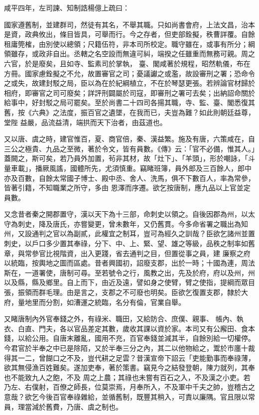\begin{pinyinscope}
 咸平四年，左司諫、知制誥楊億上疏曰：



 國家遵舊制，並建群司，然徒有其名，不舉其職。只如尚書會府，上法文昌，治本是資，政典攸出，條目皆具，可舉而行。今之存者，但吏部銓擬，秩曹詳覆。自餘租庸筦榷，由別使以總領；尺籍伍符，非本司所校定。職守雖在，或事有所分；綱領雖存，或政非自出。丞轄之名空設而無違可糾，端揆之任雖重而無務可親。周之六官，於是廢矣，且如寺、監素司於掌執，
 臺、閣咸著於規程，昭然軌儀，布在方冊。國家慮銓擬之不允，故置審官之司；憂議讞之或濫，故設審刑之署；恐命令之或失，故建封駁之局，臣以為在於紀綱植立，不在於琴瑟更張。若辨論官材歸於相府，即審官之司可廢矣；詳評刑闢屬於司寇，即審刑之署可去矣；出納詔命關於給事中，好封駁之局可罷矣。至於尚書二十四司各揚其職，寺、監、臺、閣悉復其舊，按《六典》之法度，振百官之遺墜，在我而已，夫豈為難？如此則朝廷益尊，堂陛
 益嚴，品流益清，端拱而天下治者，由茲道也。



 又以唐、虞之時，建官惟百，夏、商官倍，秦、漢益繁。施及有唐，六策咸在，自三公之極貴、九品之至微，著於令文，皆有員數。《傳》云：「官不必備，惟其人。」蓋闕之，斯可矣，若乃員外加置，茍非其材，故「灶下」、「羊頭」，形於嘲詠，「斗量車載」，播厥風謠，國體所先，尤須慎重。竊睹班簿，員外郎及三百餘人，郎中亦及百數，自餘太常國子博士、殿中丞、舍人、洗馬，俱不下數百人，率為常參，皆著引籍，不知職業之所守，多由
 恩澤而序遷。欲乞按唐制，應九品以上官並定員數。



 又念昔者秦之開郡置守，漢以天下為十三部，命刺史以領之。自後因郡為州，以太守為刺史，降及唐氏，亦嘗變更，曾未數年，又仍舊貫。今多命省署之職出為知州，又設通判之官以為副貳，此權宜之制耳，豈可為經久之訓哉？臣欲乞諸州並置刺史，以戶口多少置其奉祿，分下、中、上、緊、望、雄之等級，品秩之制率如舊章，與常參官比視階資，出入更踐，省去通判之目，但置從事之員，建
 廉察之府以統臨，按輿地之圖而區處。昔者興國初，詔廢支郡，出於一時；十國為連，周法斯在，一道署使，唐制可尋。至若號令之行，風教之出，先及於府，府以及州，州以及縣，縣及鄉里。自上而下，由近及遠，譬如身之使臂，臂之使指，提綱而眾目張，振領而群毛理。由是言之，支郡之不可廢也明矣。臣欲乞復置支郡，隸於大府，量地里而分割，如漕運之統臨，名分有倫，官業自舉。



 又睹唐制內外官奉錢之外，有祿米、職田，又給防合、庶僕、親事、
 帳內、執衣、白直、門夫，各以官品差定其數，歲收其課以資於家。本司又有公廨田、食本錢，以給公用。自唐末離亂，國用不充，百官奉錢並減其半，自餘別給一切權停。今君官於半奉之中已是除陌，又於半奉三分之內，其二以他物給之，鬻於市廛十裁得其一二，曾餬口之不及，豈代耕之足雲？昔漢宣帝下詔云「吏能勤事而奉祿薄，欲其無侵漁百姓難矣。遂加吏奉，著於策書。竊見今之結發登朝，陳力就列，其奉也不能致九人之飽，不及
 周之上農；其祿也未嘗有百石之入，不及漢之小吏。若乃左、右僕射，百僚之師長，位莫崇焉，月奉所入，不及軍中千夫之帥，豈稽古之意哉？欲乞今後百官奉祿雜給，並循舊制，既豐其稍入，可責以廉隅。官且限以常員，理當減於舊費，乃唐、虞之制也。




\end{pinyinscope}
